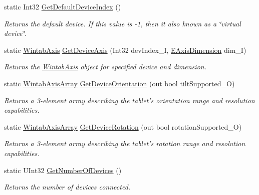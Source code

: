 \begin{DoxyCompactItemize}
static Int32 \hyperlink{class_wintab_d_n_1_1_c_wintab_info_a109ff387a12ad240dad3c2ad60324f3f}{GetDefaultDeviceIndex} ()
\begin{DoxyCompactList}\small\item\em Returns the default device. If this value is -\/1, then it also known as a \char`\"{}virtual device\char`\"{}. \item\end{DoxyCompactList}\item 
static \hyperlink{struct_wintab_d_n_1_1_wintab_axis}{WintabAxis} \hyperlink{class_wintab_d_n_1_1_c_wintab_info_a1687c6cbe3c29af468bf1fab066f8704}{GetDeviceAxis} (Int32 devIndex\_\-I, \hyperlink{namespace_wintab_d_n_a38705aa38c49c04846399172fa9fd1cd}{EAxisDimension} dim\_\-I)
\begin{DoxyCompactList}\small\item\em Returns the \hyperlink{struct_wintab_d_n_1_1_wintab_axis}{WintabAxis} object for specified device and dimension. \item\end{DoxyCompactList}\item 
static \hyperlink{struct_wintab_d_n_1_1_wintab_axis_array}{WintabAxisArray} \hyperlink{class_wintab_d_n_1_1_c_wintab_info_a8a414dc0fe7133bf250a2fbfa04c3468}{GetDeviceOrientation} (out bool tiltSupported\_\-O)
\begin{DoxyCompactList}\small\item\em Returns a 3-\/element array describing the tablet's orientation range and resolution capabilities. \item\end{DoxyCompactList}\item 
static \hyperlink{struct_wintab_d_n_1_1_wintab_axis_array}{WintabAxisArray} \hyperlink{class_wintab_d_n_1_1_c_wintab_info_a76aad63fd705c6c98e7c285b1a0baf62}{GetDeviceRotation} (out bool rotationSupported\_\-O)
\begin{DoxyCompactList}\small\item\em Returns a 3-\/element array describing the tablet's rotation range and resolution capabilities. \item\end{DoxyCompactList}\item 
static UInt32 \hyperlink{class_wintab_d_n_1_1_c_wintab_info_abdfe24f63d122351a52957cd6a52b05b}{GetNumberOfDevices} ()
\begin{DoxyCompactList}\small\item\em Returns the number of devices connected. \item\end{DoxyCompactList}\item 

\end{DoxyCompactItemize}
